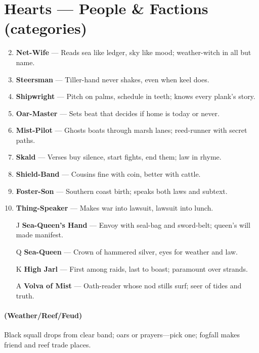 \section*{Hearts --- People \& Factions (categories)}
\label{sec:linn-people}
\begin{enumerate}
\setcounter{enumi}{1}
\item \textbf{Net-Wife} --- Reads sea like ledger, sky like mood; weather-witch in all but name.
\item \textbf{Steersman} --- Tiller-hand never shakes, even when keel does.
\item \textbf{Shipwright} --- Pitch on palms, schedule in teeth; knows every plank's story.
\item \textbf{Oar-Master} --- Sets beat that decides if home is today or never.
\item \textbf{Mist-Pilot} --- Ghosts boats through marsh lanes; reed-runner with secret paths.
\item \textbf{Skald} --- Verses buy silence, start fights, end them; law in rhyme.
\item \textbf{Shield-Band} --- Cousins fine with coin, better with cattle.
\item \textbf{Foster-Son} --- Southern coast birth; speaks both laws and subtext.
\item \textbf{Thing-Speaker} --- Makes war into lawsuit, lawsuit into lunch.
\item[J] \textbf{Sea-Queen's Hand} --- Envoy with seal-bag and sword-belt; queen's will made manifest.
\item[Q] \textbf{Sea-Queen} --- Crown of hammered silver, eyes for weather and law.
\item[K] \textbf{High Jarl} --- First among raids, last to boast; paramount over strands.
\item[A] \textbf{Volva of Mist} --- Oath-reader whose nod stills surf; seer of tides and truth.
\end{enumerate}

\paragraph*{(Weather/Reef/Feud)} Black squall drops from clear band; oars or prayers---pick one; fogfall makes friend and reef trade places.

